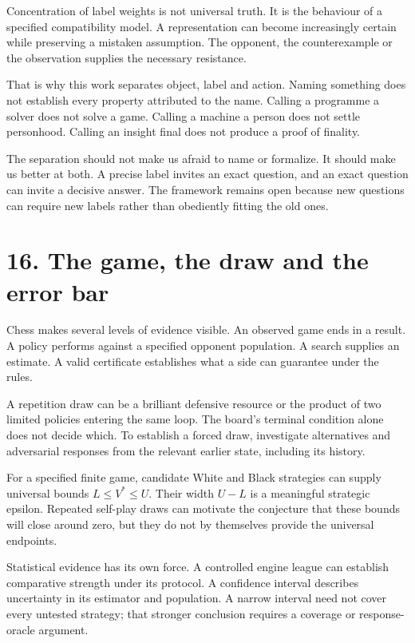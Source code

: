 \documentclass[10pt]{article}
\begin{document}
Concentration of label weights is not universal truth. It is the behaviour of a specified compatibility model. A representation can become increasingly certain while preserving a mistaken assumption. The opponent, the counterexample or the observation supplies the necessary resistance.

That is why this work separates object, label and action. Naming something does not establish every property attributed to the name. Calling a programme a solver does not solve a game. Calling a machine a person does not settle personhood. Calling an insight final does not produce a proof of finality.

The separation should not make us afraid to name or formalize. It should make us better at both. A precise label invites an exact question, and an exact question can invite a decisive answer. The framework remains open because new questions can require new labels rather than obediently fitting the old ones.

\clearpage
\section*{16. The game, the draw and the error bar}
Chess makes several levels of evidence visible. An observed game ends in a result. A policy performs against a specified opponent population. A search supplies an estimate. A valid certificate establishes what a side can guarantee under the rules.

A repetition draw can be a brilliant defensive resource or the product of two limited policies entering the same loop. The board's terminal condition alone does not decide which. To establish a forced draw, investigate alternatives and adversarial responses from the relevant earlier state, including its history.

For a specified finite game, candidate White and Black strategies can supply universal bounds $L\le V^*\le U$. Their width $U-L$ is a meaningful strategic epsilon. Repeated self-play draws can motivate the conjecture that these bounds will close around zero, but they do not by themselves provide the universal endpoints.

Statistical evidence has its own force. A controlled engine league can establish comparative strength under its protocol. A confidence interval describes uncertainty in its estimator and population. A narrow interval need not cover every untested strategy; that stronger conclusion requires a coverage or response-oracle argument.
\end{document}
